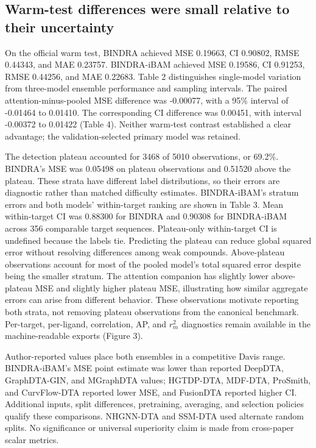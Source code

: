 \documentclass[12pt,a4paper]{article}
\begin{document}
\nolinenumbers\linenumbers
\subsection*{Warm-test differences were small relative to their uncertainty}
On the official warm test, BINDRA achieved MSE 0.19663, CI 0.90802, RMSE 0.44343, and MAE 0.23757. BINDRA-iBAM achieved MSE 0.19586, CI 0.91253, RMSE 0.44256, and MAE 0.22683. Table 2 distinguishes single-model variation from three-model ensemble performance and sampling intervals. The paired attention-minus-pooled MSE difference was -0.00077, with a 95\% interval of -0.01464 to 0.01410. The corresponding CI difference was 0.00451, with interval -0.00372 to 0.01422 (Table 4). Neither warm-test contrast established a clear advantage; the validation-selected primary model was retained.

\nolinenumbers\linenumbers
The detection plateau accounted for 3468 of 5010 observations, or 69.2\%. BINDRA's MSE was 0.05498 on plateau observations and 0.51520 above the plateau. These strata have different label distributions, so their errors are diagnostic rather than matched difficulty estimates. BINDRA-iBAM's stratum errors and both models' within-target ranking are shown in Table 3. Mean within-target CI was 0.88300 for BINDRA and 0.90308 for BINDRA-iBAM across 356 comparable target sequences. Plateau-only within-target CI is undefined because the labels tie. Predicting the plateau can reduce global squared error without resolving differences among weak compounds. Above-plateau observations account for most of the pooled model's total squared error despite being the smaller stratum. The attention companion has slightly lower above-plateau MSE and slightly higher plateau MSE, illustrating how similar aggregate errors can arise from different behavior. These observations motivate reporting both strata, not removing plateau observations from the canonical benchmark. Per-target, per-ligand, correlation, AP, and \(r_m^2\) diagnostics remain available in the machine-readable exports (Figure 3).

\nolinenumbers\linenumbers
Author-reported values place both ensembles in a competitive Davis range. BINDRA-iBAM's MSE point estimate was lower than reported DeepDTA, GraphDTA-GIN, and MGraphDTA values; HGTDP-DTA, MDF-DTA, ProSmith, and CurvFlow-DTA reported lower MSE, and FusionDTA reported higher CI. Additional inputs, split differences, pretraining, averaging, and selection policies qualify these comparisons. NHGNN-DTA and SSM-DTA used alternate random splits. No significance or universal superiority claim is made from cross-paper scalar metrics.
\end{document}
